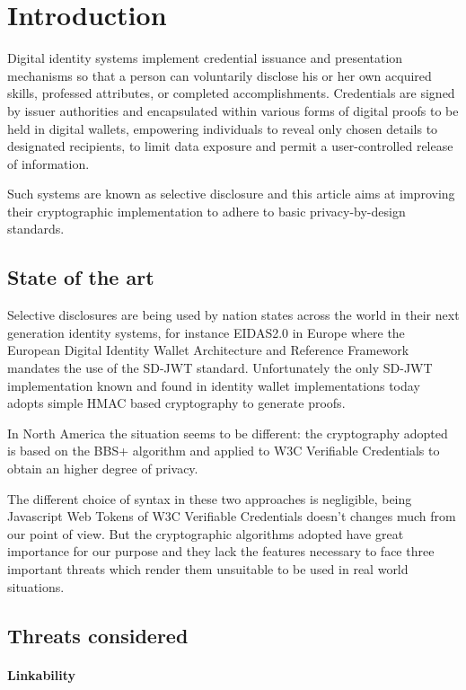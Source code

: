 \documentclass[conference]{IEEEtran}
\begin{document}
\section{Introduction}
Digital identity systems implement credential issuance and presentation mechanisms so that a person can voluntarily disclose his or her own acquired skills, professed attributes, or completed accomplishments. Credentials are signed by issuer authorities and encapsulated within various forms of digital proofs to be held in digital wallets, empowering individuals to reveal only chosen details to designated recipients, to limit data exposure and permit a user-controlled release of information.

Such systems are known as selective disclosure and this article aims at improving their cryptographic implementation to adhere to basic privacy-by-design standards.

\subsection{State of the art}

Selective disclosures are being used by nation states across the world in their next generation identity systems, for instance EIDAS2.0 in Europe where the European Digital Identity Wallet Architecture and Reference Framework mandates the use of the SD-JWT standard. Unfortunately the only SD-JWT implementation known and found in identity wallet implementations today adopts simple HMAC based cryptography to generate proofs.

In North America the situation seems to be different: the cryptography adopted is based on the BBS+ algorithm and applied to W3C Verifiable Credentials to obtain an higher degree of privacy.

The different choice of syntax in these two approaches is negligible, being Javascript Web Tokens of W3C Verifiable Credentials doesn't changes much from our point of view. But the cryptographic algorithms adopted have great importance for our purpose and they lack the features necessary to face three important threats which render them unsuitable to be used in real world situations.

\subsection{Threats considered}

\paragraph{Linkability}
\end{document}
